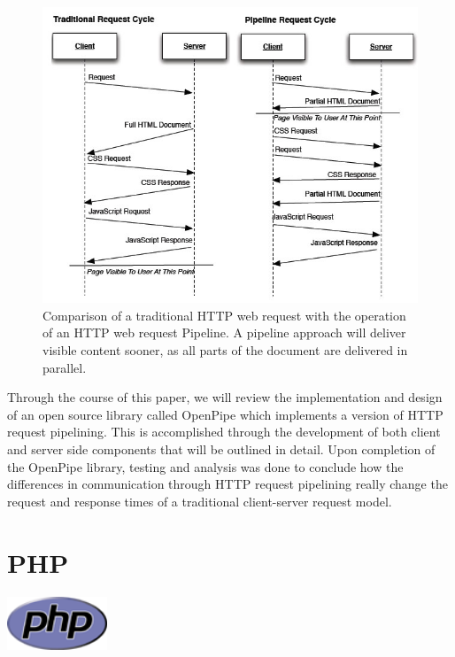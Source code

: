 \documentclass[12pt]{report}
\begin{document}
\begin{figure}[H]
\centering
\includegraphics[width=145mm]{figures/images/HTTP_request_cycles.jpg}
\caption{Comparison of a traditional HTTP web request with the operation of an HTTP web request Pipeline. A pipeline approach will deliver visible content sooner, as all parts of the  document are delivered in parallel.}
\label{fig:HTTPRequestCycles}
\end{figure}

Through the course of this paper, we will review the implementation and design of an open source library called OpenPipe which implements a version of HTTP request pipelining. This is accomplished through the development of both client and server side components that will be outlined in detail. Upon completion of the OpenPipe library, testing and analysis was done to conclude how the differences in communication through HTTP request pipelining really change the request and response times of a traditional client-server request model.


\section{PHP}
\begin{center} 
\includegraphics[width=30mm]{figures/images/php_logo.png}
\end{center}
\end{document}
